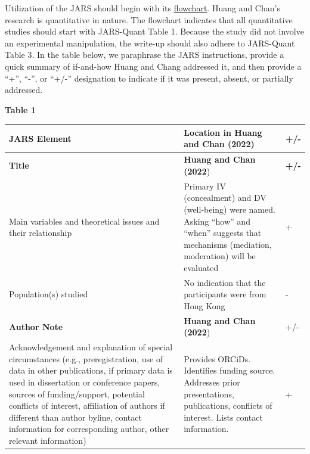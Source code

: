 \documentclass[
  11pt,
]{book}
\newcounter{none} %
\begin{document}
Utilization of the JARS should begin with its \href{https://apastyle.apa.org/jars/jars-quant-decision-flowchart.pdf}{flowchart}. Huang and Chan's \citeyearpar{huang_effects_2022} research is quantitative in nature. The flowchart indicates that all quantitative studies should start with JARS-Quant Table 1. Because the study did not involve an experimental manipulation, the write-up should also adhere to JARS-Quant Table 3. In the table below, we paraphrase the JARS instructions, provide a quick summary of if-and-how Huang and Chang addressed it, and then provide a ``+'', ``-'', or ``+/-'' designation to indicate if it was present, absent, or partially addressed.

\textbf{Table 1}

{\def\LTcaptype{none} %
\begin{longtable}[]{@{}
  >{\raggedright\arraybackslash}p{}
  >{\raggedright\arraybackslash}p{}
  >{\centering\arraybackslash}p{}@{}}
\toprule\noalign{}
\begin{minipage}[b]{\linewidth}\raggedright
JARS Element
\end{minipage} & \begin{minipage}[b]{\linewidth}\raggedright
Location in Huang and Chan (2022)
\end{minipage} & \begin{minipage}[b]{\linewidth}\centering
+/-
\end{minipage} \\
\midrule\noalign{}
\endhead
\bottomrule\noalign{}
\endlastfoot
\textbf{Title} & \textbf{Huang and Chan (2022}) & \textbf{+/-} \\
Main variables and theoretical issues and their relationship & Primary IV (concealment) and DV (well-being) were named. Asking ``how'' and ``when'' suggests that mechanisms (mediation, moderation) will be evaluated & + \\
Population(s) studied & No indication that the participants were from Hong Kong & - \\
\textbf{Author Note} & \textbf{Huang and Chan (2022}) & +/- \\
Acknowledgement and explanation of special circumstances (e.g., preregistration, use of data in other publications, if primary data is used in dissertation or conference papers, sources of funding/support, potential conflicts of interest, affiliation of authors if different than author byline, contact information for corresponding author, other relevant information) & Provides ORCiDs. Identifies funding source. Addresses prior presentations, publications, conflicts of interest. Lists contact information. & + \\

\end{longtable}}
\end{document}
